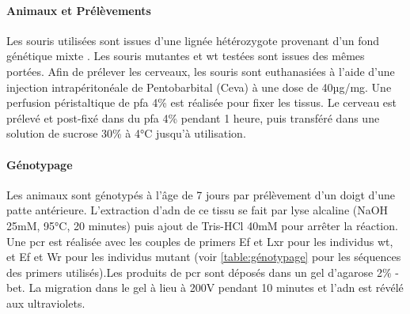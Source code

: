 \paragraph{Animaux et Prélèvements}
\label{par:AnimEtPrelev}
	Les souris utilisées sont issues d'une lignée hétérozygote provenant d'un fond génétique mixte \cite{Messeant2015, Messeant2017}. Les souris mutantes \mcrd et \gls{wt} testées sont issues des mêmes portées. Afin de prélever les cerveaux, les souris sont  euthanasiées à l'aide d'une injection intrapéritonéale de Pentobarbital (Ceva\textregistered) à une dose de 40µg/mg. Une perfusion péristaltique de \gls{pfa} 4\% est réalisée pour fixer les tissus. Le cerveau est prélevé et post-fixé dans du \gls{pfa} 4\% pendant 1 heure, puis transféré dans une solution de sucrose 30\% à 4°C jusqu'à utilisation. 
	
\paragraph{Génotypage}
\label{par:genotypage}
	Les animaux sont génotypés à l'âge de 7 jours par prélèvement d'un doigt d'une patte antérieure. L'extraction d'\acrshort{adn} de ce tissu se fait par lyse alcaline (NaOH 25mM, 95°C, 20 minutes) puis ajout de Tris-HCl 40mM pour arrêter la réaction. Une \acrshort{pcr} est réalisée avec les couples de primers Ef et Lxr  pour les individus \gls{wt}, et Ef et Wr pour les individus mutant (voir \cref{table:génotypage} pour les séquences des primers utilisés).Les produits de \acrshort{pcr} sont déposés dans un gel d'agarose 2\% - \acrshort{bet}. La migration dans le gel à lieu à 200V pendant 10 minutes et l'\acrfull{adn} est révélé aux ultraviolets.
	
	\begin{table}[h]
	\end{table}
\FloatBarrier
	
